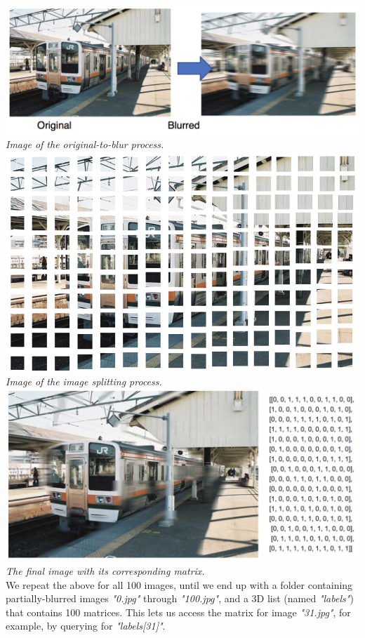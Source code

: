 \documentclass{article}
\begin{document}
\includegraphics[width=\textwidth]{blur} \\
\textit{Image of the original-to-blur process.} \\ 
\includegraphics[width=\textwidth]{patches} \\
\textit{Image of the image splitting process.} \\
\includegraphics[width=\textwidth]{matrix} \\
\textit{The final image with its corresponding matrix.} \\

We repeat the above for all 100 images, until we end up with a folder containing 
partially-blurred images \textit{"0.jpg"} through \textit{"100.jpg"}, and a 3D list 
(named \textit{"labels"}) that contains 100 matrices. This lets us access the matrix for 
image \textit{"31.jpg"}, for example, by querying for \textit{"labels[31]"}.
\end{document}

